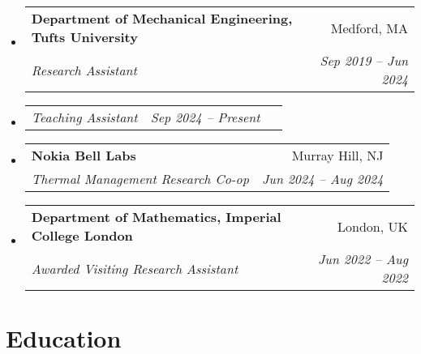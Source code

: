 \documentclass[letterpaper,11pt]{article}
\begin{document}
\newcommand{\EmpList}{\begin{itemize}[leftmargin=0.00in]}
\newcommand{\EmpListEnd}{\end{itemize}\vspace{0pt}}

\newcommand{\RoleII}[4]{
  \vspace{0pt}\item[]
    \begin{tabular*}{1\textwidth}[t]{l@{\extracolsep{\fill}}r}
      \textbf{#1} & #2 \\
      \textit{#3} & \textit{\small #4} \\
    \end{tabular*}\vspace{-8pt}}

\newcommand{\RoleIINohead}[2]{
  \vspace{-5pt}\item[]
    \begin{tabular*}{1\textwidth}[t]{l@{\extracolsep{\fill}}r}
    \textit{#1} & \textit{\small #2} \\
    \end{tabular*}\vspace{-14pt}}


\EmpList
\RoleII
{Department of Mechanical Engineering, Tufts University}{Medford, MA}
{Research Assistant}{Sep 2019 -- Jun 2024}
\RoleIINohead
{Teaching Assistant}{Sep 2024 -- Present~~\,}
\RoleII
{Nokia Bell Labs}{Murray Hill, NJ}
{Thermal Management Research Co-op}{Jun 2024 -- Aug 2024}
\RoleII
{Department of Mathematics, Imperial College London}{London, UK}
{Awarded Visiting Research Assistant}{Jun 2022 -- Aug 2022}
\EmpListEnd


\section{Education} %

\newcommand{\BeginEduList}{\begin{itemize}[leftmargin=0.00in]}
\newcommand{\EndEduList}{\end{itemize}\vspace{-5pt}}

\newcommand{\EduRole}[4]{
  \vspace{0pt}\item[]
    \begin{tabular*}{1\textwidth}[t]{l@{\extracolsep{\fill}}r}
      \textbf{#1} & #2 \\
      \textit{#3} & \textit{\small #4} \\
    \end{tabular*}\vspace{-8pt}}
\end{document}
